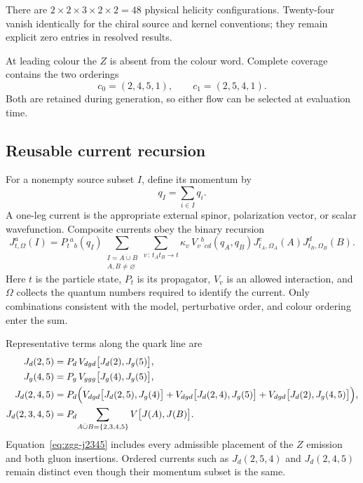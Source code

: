 There are \(2\times2\times3\times2\times2=48\) physical helicity
configurations.  Twenty-four vanish identically for the chiral source and
kernel conventions; they remain explicit zero entries in resolved results.

At leading colour the \(Z\) is absent from the colour word.  Complete coverage
contains the two orderings
\begin{equation}
  c_0=(2,4,5,1),\qquad c_1=(2,5,4,1).
  \label{eq:zgg-physical-flows}
\end{equation}
Both are retained during generation, so either flow can be selected at
evaluation time.

\subsection{Reusable current recursion}

For a nonempty source subset \(I\), define its momentum by
\begin{equation}
  q_I=\sum_{i\in I}q_i .
  \label{eq:zgg-subset-mask}
\end{equation}
A one-leg current is the appropriate external spinor, polarization vector, or
scalar wavefunction.  Composite currents obey the binary recursion
\begin{equation}
  J_{t,\Omega}^{a}(I)
  =P_t{}^{a}{}_{b}(q_I)
   \sum_{\substack{I=A\mathbin{\dot\cup}B\\
                   A,B\ne\varnothing}}
   \sum_{v\,:\,t_A t_B\to t}
   \kappa_v\,
   V_v{}^{b}{}_{cd}(q_A,q_B)
   J_{t_A,\Omega_A}^{c}(A)
   J_{t_B,\Omega_B}^{d}(B).
  \label{eq:zgg-current-recursion}
\end{equation}
Here \(t\) is the particle state, \(P_t\) is its propagator, \(V_v\) is an
allowed interaction, and \(\Omega\) collects the quantum numbers required to
identify the current.  Only combinations consistent with the model,
perturbative order, and colour ordering enter the sum.

Representative terms along the quark line are
\begin{align}
 J_d(2,5) &={P}_d\,V_{dgd}\bigl[J_d(2),J_g(5)\bigr],
 \label{eq:zgg-j25}\\
 J_g(4,5) &={P}_g\,V_{ggg}\bigl[J_g(4),J_g(5)\bigr],
 \label{eq:zgg-j45}\\
 J_d(2,4,5) &={P}_d\Bigl(
     V_{dgd}\bigl[J_d(2,5),J_g(4)\bigr]
    +V_{dgd}\bigl[J_d(2,4),J_g(5)\bigr]
    +V_{dgd}\bigl[J_d(2),J_g(4,5)\bigr]
  \Bigr),
 \label{eq:zgg-j245}\\
 J_d(2,3,4,5) &={P}_d\!\sum_{A\dot\cup B=\{2,3,4,5\}}
   V\bigl[J(A),J(B)\bigr].
 \label{eq:zgg-j2345}
\end{align}
Equation~\eqref{eq:zgg-j2345} includes every admissible placement of the
\(Z\) emission and both gluon insertions.  Ordered currents such as
\(J_d(2,5,4)\) and \(J_d(2,4,5)\) remain distinct even though their momentum
subset is the same.

